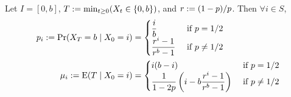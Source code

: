 \documentclass[a4paper, 12pt, fleqn]{article}
\begin{document}
\begin{lemma}
Let $I = [0, b]$, $T := \min_{t \ge 0} (X_t \in \{0, b\})$, and $r := (1-p)/p$.
Then $\forall i \in S$,
\begin{align*}
p_i := \Pr(X_T = b \mid X_0 = i) &= \begin{cases}
\displaystyle \frac{i}{b} & \textrm{ if } p = 1/2
\\ \displaystyle \frac{r^i-1}{r^b-1} & \textrm{ if } p \neq 1/2
\end{cases}
\\ \mu_i := \operatorname*{E}(T \mid X_0 = i) &= \begin{cases}
i(b-i) & \textrm{ if } p = 1/2
\\ \displaystyle \frac{1}{1-2p}\left(i - b\frac{r^i-1}{r^b-1}\right) & \textrm{ if } p \neq 1/2
\end{cases}
\end{align*}
\end{lemma}
\end{document}
